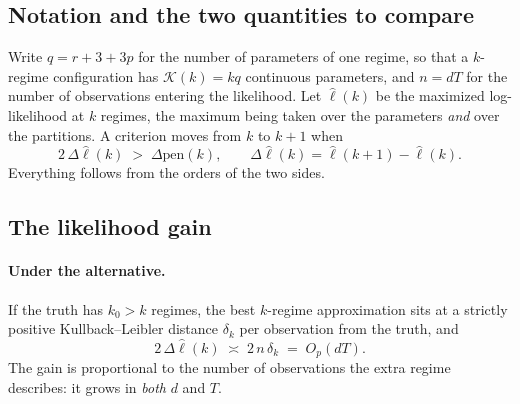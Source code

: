 \documentclass[11pt]{article}
\begin{document}
\subsection{Notation and the two quantities to compare}

Write $q = r + 3 + 3p$ for the number of parameters of one regime, so that a $k$-regime configuration has $\mathcal{K}(k) = kq$ continuous parameters, and $n = dT$ for the number of observations entering the likelihood. Let $\hat\ell(k)$ be the maximized log-likelihood at $k$ regimes, the maximum being taken over the parameters \emph{and} over the partitions. A criterion moves from $k$ to $k+1$ when
\begin{equation}\label{eq:sm:rule}
  2\,\Delta\hat\ell(k) \;>\; \Delta\mathrm{pen}(k),
  \qquad
  \Delta\hat\ell(k) = \hat\ell(k+1) - \hat\ell(k).
\end{equation}
Everything follows from the orders of the two sides.

\subsection{The likelihood gain}

\paragraph{Under the alternative.} If the truth has $k_0 > k$ regimes, the best $k$-regime approximation sits at a strictly positive Kullback--Leibler distance $\delta_k$ per observation from the truth, and
\begin{equation}\label{eq:sm:gainalt}
  2\,\Delta\hat\ell(k) \;\asymp\; 2\, n\, \delta_k \;=\; O_p(dT).
\end{equation}
The gain is proportional to the number of observations the extra regime describes: it grows in \emph{both} $d$ and $T$.
\end{document}
